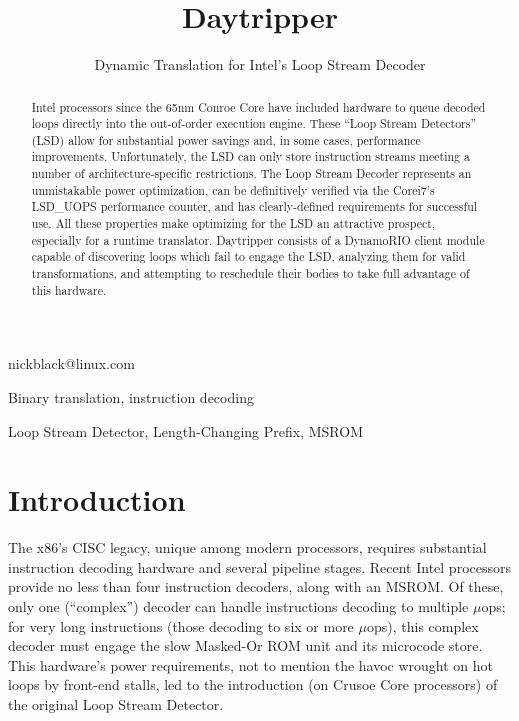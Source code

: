 \documentclass[]{sigplanconf}
\begin{document}

\title{Daytripper}
\subtitle{Dynamic Translation for Intel's Loop Stream Decoder}

           {nickblack@linux.com}

\maketitle

\begin{abstract}
Intel processors since the 65nm Conroe Core
have included hardware to queue decoded loops directly into the out-of-order
execution engine. These ``Loop
Stream Detectors'' (LSD) allow for substantial power savings and, in some
cases, performance improvements. Unfortunately, the LSD can only store
instruction streams meeting a number of architecture-specific restrictions.
The Loop Stream Decoder represents an unmistakable power optimization, can be
definitively verified via the Core\texttrademark i7's LSD\_UOPS performance
counter, and has clearly-defined requirements for successful use. All these
properties make optimizing for the LSD an attractive prospect, especially for
a runtime translator. Daytripper consists of a DynamoRIO \cite{dynamorio} client
module capable of discovering loops which fail to engage the LSD, analyzing
them for valid transformations, and attempting to reschedule their bodies to
take full advantage of this hardware.
\end{abstract}


\terms
Binary translation, instruction decoding

\keywords
Loop Stream Detector, Length-Changing Prefix, MSROM

\section{Introduction}
The x86's CISC legacy, unique among modern processors, requires substantial
instruction decoding hardware and several pipeline stages. Recent Intel processors
provide no less than four instruction decoders, along with an MSROM. Of these,
only one (``complex'') decoder can handle instructions decoding to multiple
$\mu$ops; for very long instructions (those decoding to six or more $\mu$ops),
this complex decoder must engage the slow Masked-Or ROM unit and its
microcode store. This hardware's power requirements, not to mention the havoc
wrought on hot loops by front-end stalls, led to the introduction (on Crusoe
Core processors) of the original Loop Stream Detector.
\end{document}
